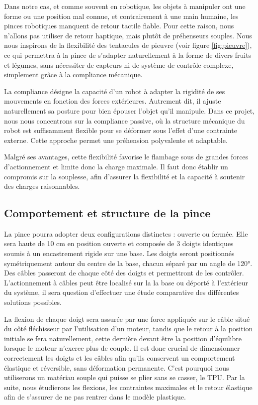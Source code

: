 \documentclass[a4paper, 11pt]{report}
\begin{document}
        Dans notre cas, et comme souvent en robotique, les objets à manipuler ont une forme ou une position mal connue, et contrairement à une main humaine, les pinces robotiques manquent de retour tactile fiable. Pour cette raison, nous n'allons pas utiliser de retour haptique, mais plutôt de préhenseurs souples. Nous nous inspirons de la flexibilité des tentacules de pieuvre (voir figure \ref{fig:pieuvre}), ce qui permettra à la pince de s'adapter naturellement à la forme de divers fruits et légumes, sans nécessiter de capteurs ni de système de contrôle complexe, simplement grâce à la compliance mécanique.
        
        La compliance désigne la capacité d’un robot à adapter la rigidité de ses mouvements en fonction des forces extérieures. Autrement dit, il ajuste naturellement sa posture pour bien épouser l’objet qu’il manipule. Dans ce projet, nous nous concentrons sur la compliance passive, où la structure mécanique du robot est suffisamment flexible pour se déformer sous l'effet d'une contrainte externe. Cette approche permet une préhension polyvalente et adaptable. \cite{noauthor_gestion_2016}

        Malgré ses avantages, cette flexibilité favorise le flambage sous de grandes forces d'actionnement et limite donc la charge maximale. Il faut donc établir un compromis sur la souplesse, afin d'assurer la flexibilité et la capacité à soutenir des charges raisonnables. \cite{wang_spirobs_2025}
    
    \subsection{Comportement et structure de la pince}
    
        La pince pourra adopter deux configurations distinctes : ouverte ou fermée. Elle sera haute de 10 cm en position ouverte et composée de 3 doigts identiques soumis à un encastrement rigide sur une base. Les doigts seront positionnés symétriquement autour du centre de la base, chacun séparé par un angle de 120°. Des câbles passeront de chaque côté des doigts et permettront de les contrôler. L'actionnement à câbles peut être localisé sur la la base ou déporté à l'extérieur du système, il sera question d'effectuer une étude comparative des différentes solutions possibles.
        
        La flexion de chaque doigt sera assurée par une force appliquée sur le câble situé du côté fléchisseur par l'utilisation d'un moteur, tandis que le retour à la position initiale se fera naturellement, cette dernière devant être la position d'équilibre lorsque le moteur n'exerce plus de couple. Il est donc crucial de dimensionner correctement les doigts et les câbles afin qu'ils conservent un comportement élastique et réversible, sans déformation permanente. C'est pourquoi nous utiliserons un matériau souple qui puisse se plier sans se casser, le TPU. Par la suite, nous étudierons les flexions, les contraintes maximales et le retour élastique afin de s'assurer de ne pas rentrer dans le modèle plastique.
                
\end{document}
